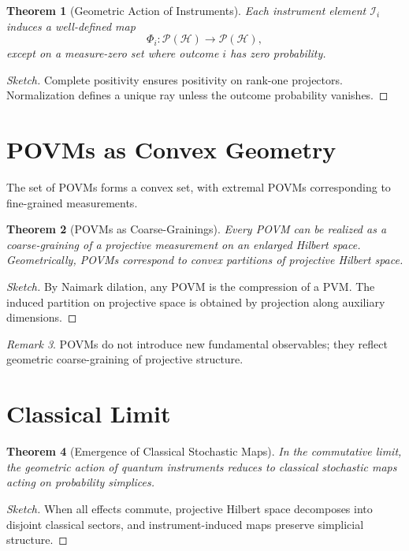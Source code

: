 \documentclass[12pt]{book}
\theoremstyle{plain}
\newtheorem{theorem}{Theorem}[chapter]
\theoremstyle{definition}
\theoremstyle{remark}
\newtheorem{remark}[theorem]{Remark}
\begin{document}
\begin{theorem}[Geometric Action of Instruments]
Each instrument element $\mathcal{I}_i$ induces a well-defined map
\[
\Phi_i : \mathcal{P}(\mathcal{H}) \to \mathcal{P}(\mathcal{H}),
\]
except on a measure-zero set where outcome $i$ has zero probability.
\end{theorem}

\begin{proof}[Sketch]
Complete positivity ensures positivity on rank-one projectors. Normalization defines a unique ray unless the outcome probability vanishes.
\end{proof}

\section{POVMs as Convex Geometry}

The set of POVMs forms a convex set, with extremal POVMs corresponding to fine-grained measurements.

\begin{theorem}[POVMs as Coarse-Grainings]
Every POVM can be realized as a coarse-graining of a projective measurement on an enlarged Hilbert space. Geometrically, POVMs correspond to convex partitions of projective Hilbert space.
\end{theorem}

\begin{proof}[Sketch]
By Naimark dilation, any POVM is the compression of a PVM. The induced partition on projective space is obtained by projection along auxiliary dimensions.
\end{proof}

\begin{remark}
POVMs do not introduce new fundamental observables; they reflect geometric coarse-graining of projective structure.
\end{remark}

\section{Classical Limit}

\begin{theorem}[Emergence of Classical Stochastic Maps]
In the commutative limit, the geometric action of quantum instruments reduces to classical stochastic maps acting on probability simplices.
\end{theorem}

\begin{proof}[Sketch]
When all effects commute, projective Hilbert space decomposes into disjoint classical sectors, and instrument-induced maps preserve simplicial structure.
\end{proof}
\end{document}
